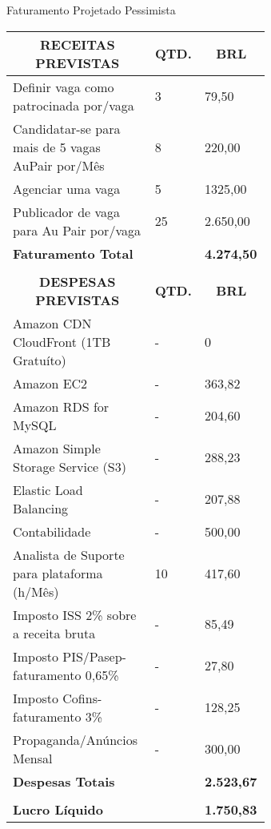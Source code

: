 \begin{enumerate}
    \begin{quadro}[H]
    \caption{Faturamento Projetado Pessimista}
    \label{faturamento-projetado-pessimista}
    	\centering\footnotesize
        \begin{tabular}{|p{0.50\linewidth} | p{0.04\linewidth} |  p{0.10\linewidth} |}  \hline

        \multicolumn{1}{|c|}{\textbf{RECEITAS PREVISTAS}} &
        \multicolumn{1}{|c|}{\textbf{QTD.}} &
        \multicolumn{1}{|c|}{\textbf{BRL}} \\ \hline


    Definir vaga como patrocinada por/vaga  & 3 & 79,50      \\ \hline
    Candidatar-se para mais de 5 vagas AuPair por/Mês     &  8 & 220,00     \\ \hline
    Agenciar uma vaga             &  5  & 1325,00          \\ \hline
    Publicador de vaga para Au Pair por/vaga     & 25  &   2.650,00     \\ \hline
    {\textbf{Faturamento Total}}   &   &   {\textbf{4.274,50}}           \\  \hline 


    &   &        \\ \hline
    \multicolumn{1}{|c|}{\textbf{DESPESAS PREVISTAS}} &
    \multicolumn{1}{|c|}{\textbf{QTD.}} &
    \multicolumn{1}{|c|}{\textbf{BRL}} \\ \hline

    Amazon CDN CloudFront (1TB Gratuíto) & - & 0 \\ \hline 
    Amazon EC2 & - & 363,82\\ \hline
    Amazon RDS for MySQL & - & 204,60 \\ \hline
    Amazon Simple Storage Service (S3) & - & 288,23 \\ \hline
    Elastic Load Balancing & - & 207,88 \\ \hline
    Contabilidade & - & 500,00 \\ \hline
    Analista de Suporte para plataforma (h/Mês) & 10 & 417,60  \\ \hline
    Imposto ISS 2\% sobre a receita bruta & - & 85,49  \\ \hline
    Imposto PIS/Pasep-faturamento 0,65\% & - & 27,80  \\ \hline
    Imposto Cofins-faturamento 3\% & - & 128,25  \\ \hline
    Propaganda/Anúncios Mensal    & - &  300,00  \\ \hline
    
    
    {\textbf{Despesas Totais}}   &   &   {\textbf{2.523,67}}           \\  \hline 


        & &   \\  \hline   
    {\textbf{Lucro Líquido}}   &   &   {\textbf{1.750,83}}           \\  \hline 

        \end{tabular}
    \end{quadro}
\end{enumerate}